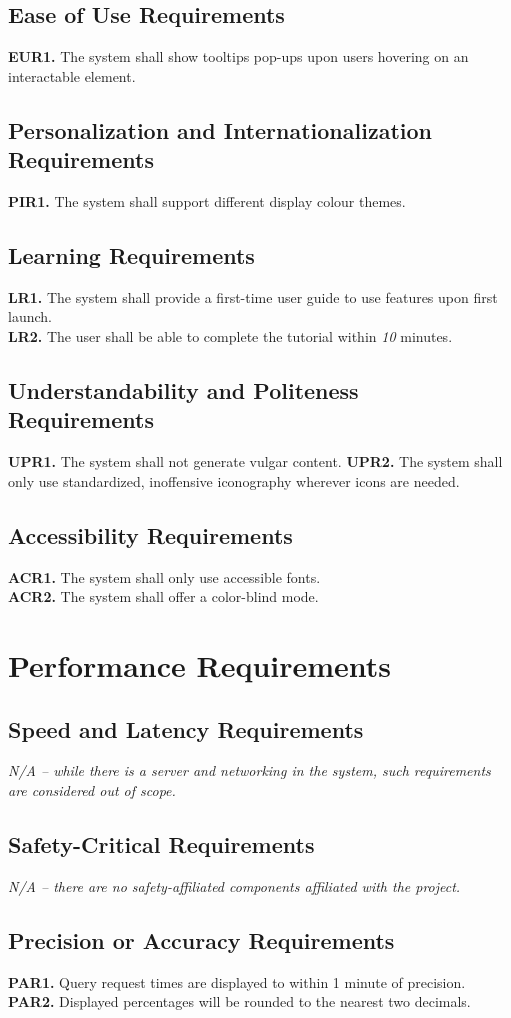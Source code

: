 \documentclass[12pt]{article}
\begin{document}
\subsection{Ease of Use Requirements}
\textbf{EUR1.} The system shall show tooltips pop-ups upon users hovering on an interactable element.
\subsection{Personalization and Internationalization Requirements}
\textbf{PIR1.} The system shall support different display colour themes.
\subsection{Learning Requirements}
\textbf{LR1.} The system shall provide a first-time user guide to use features upon first launch. \\
\textbf{LR2.} The user shall be able to complete the tutorial within \emph{10} minutes.
\subsection{Understandability and Politeness Requirements}
\textbf{UPR1.} The system shall not generate vulgar content.
\textbf{UPR2.} The system shall only use standardized, inoffensive iconography wherever icons are needed.
\subsection{Accessibility Requirements}
\textbf{ACR1.} The system shall only use accessible fonts. \\
\textbf{ACR2.} The system shall offer a color-blind mode.
\section{Performance Requirements}
\subsection{Speed and Latency Requirements}
\emph{N/A -- while there is a server and networking in the system, such requirements are considered out of scope.}
\subsection{Safety-Critical Requirements}
\emph{N/A -- there are no safety-affiliated components affiliated with the project.}
\subsection{Precision or Accuracy Requirements}
\textbf{PAR1.} Query request times are displayed to within 1 minute of precision. \\
\textbf{PAR2.} Displayed percentages will be rounded to the nearest two decimals.
\end{document}
